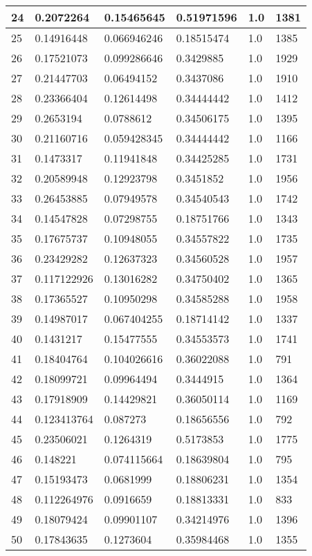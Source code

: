 \begin{longtable}{|l|l|l|l|l|l|}
24 & 0.2072264 & 0.15465645 & 0.51971596 & 1.0 & 1381 \\ \hline 
25 & 0.14916448 & 0.066946246 & 0.18515474 & 1.0 & 1385 \\ \hline 
26 & 0.17521073 & 0.099286646 & 0.3429885 & 1.0 & 1929 \\ \hline 
27 & 0.21447703 & 0.06494152 & 0.3437086 & 1.0 & 1910 \\ \hline 
28 & 0.23366404 & 0.12614498 & 0.34444442 & 1.0 & 1412 \\ \hline 
29 & 0.2653194 & 0.0788612 & 0.34506175 & 1.0 & 1395 \\ \hline 
30 & 0.21160716 & 0.059428345 & 0.34444442 & 1.0 & 1166 \\ \hline 
31 & 0.1473317 & 0.11941848 & 0.34425285 & 1.0 & 1731 \\ \hline 
32 & 0.20589948 & 0.12923798 & 0.3451852 & 1.0 & 1956 \\ \hline 
33 & 0.26453885 & 0.07949578 & 0.34540543 & 1.0 & 1742 \\ \hline 
34 & 0.14547828 & 0.07298755 & 0.18751766 & 1.0 & 1343 \\ \hline 
35 & 0.17675737 & 0.10948055 & 0.34557822 & 1.0 & 1735 \\ \hline 
36 & 0.23429282 & 0.12637323 & 0.34560528 & 1.0 & 1957 \\ \hline 
37 & 0.117122926 & 0.13016282 & 0.34750402 & 1.0 & 1365 \\ \hline 
38 & 0.17365527 & 0.10950298 & 0.34585288 & 1.0 & 1958 \\ \hline 
39 & 0.14987017 & 0.067404255 & 0.18714142 & 1.0 & 1337 \\ \hline 
40 & 0.1431217 & 0.15477555 & 0.34553573 & 1.0 & 1741 \\ \hline 
41 & 0.18404764 & 0.104026616 & 0.36022088 & 1.0 & 791 \\ \hline 
42 & 0.18099721 & 0.09964494 & 0.3444915 & 1.0 & 1364 \\ \hline 
43 & 0.17918909 & 0.14429821 & 0.36050114 & 1.0 & 1169 \\ \hline 
44 & 0.123413764 & 0.087273 & 0.18656556 & 1.0 & 792 \\ \hline 
45 & 0.23506021 & 0.1264319 & 0.5173853 & 1.0 & 1775 \\ \hline 
46 & 0.148221 & 0.074115664 & 0.18639804 & 1.0 & 795 \\ \hline 
47 & 0.15193473 & 0.0681999 & 0.18806231 & 1.0 & 1354 \\ \hline 
48 & 0.112264976 & 0.0916659 & 0.18813331 & 1.0 & 833 \\ \hline 
49 & 0.18079424 & 0.09901107 & 0.34214976 & 1.0 & 1396 \\ \hline 
50 & 0.17843635 & 0.1273604 & 0.35984468 & 1.0 & 1355 \\ \hline 
\end{longtable}